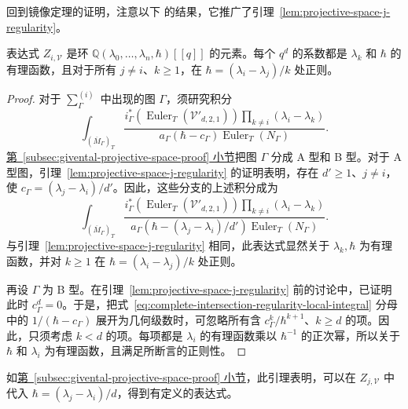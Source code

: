 回到镜像定理的证明，注意以下  的结果，它推广了引理~\ref{lem:projective-space-j-regularity}。
\begin{lemma}\label{lem:complete-intersection-j-regularity}
表达式 $Z_{i,\mathcal V}$ 是环 $\mathbb Q(\lambda_0,\ldots,\lambda_n,\hbar)[[q]]$ 的元素。每个 $q^d$ 的系数都是 $\lambda_k$ 和 $\hbar$ 的有理函数，且对于所有 $j\ne i$、$k\ge1$，在 $\hbar=(\lambda_i-\lambda_j)/k$ 处正则。
\end{lemma}
\begin{proof}
对于 $\sum_\Gamma^{(i)}$ 中出现的图 $\Gamma$，须研究积分
\begin{equation}\label{eq:complete-intersection-regularity-local-integral}
\int_{(\overline M_\Gamma)_T}\frac{i_\Gamma^*(\operatorname{Euler}_T(\mathcal V'_{d,2,1}))\prod_{k\ne i}(\lambda_i-\lambda_k)}{a_\Gamma(\hbar-c_\Gamma)\operatorname{Euler}_T(N_\Gamma)}.
\end{equation}
\hyperref[subsec:givental-projective-space-proof]{第~\ref*{subsec:givental-projective-space-proof} 小节}把图 $\Gamma$ 分成 A 型和 B 型。对于 A 型图，引理~\ref{lem:projective-space-j-regularity} 的证明表明，存在 $d'\ge1$、$j\ne i$，使 $c_\Gamma=(\lambda_j-\lambda_i)/d'$。因此，这些分支的上述积分成为
\[
\int_{(\overline M_\Gamma)_T}\frac{i_\Gamma^*(\operatorname{Euler}_T(\mathcal V'_{d,2,1}))\prod_{k\ne i}(\lambda_i-\lambda_k)}{a_\Gamma(\hbar-(\lambda_j-\lambda_i)/d')\operatorname{Euler}_T(N_\Gamma)}.
\]
与引理~\ref{lem:projective-space-j-regularity} 相同，此表达式显然关于 $\lambda_k,\hbar$ 为有理函数，并对 $k\ge1$ 在 $\hbar=(\lambda_i-\lambda_j)/k$ 处正则。

再设 $\Gamma$ 为 B 型。在引理~\ref{lem:projective-space-j-regularity} 前的讨论中，已证明此时 $c_\Gamma^d=0$。于是，把式~\eqref{eq:complete-intersection-regularity-local-integral} 分母中的 $1/(\hbar-c_\Gamma)$ 展开为几何级数时，可忽略所有含 $c_\Gamma^k/\hbar^{k+1}$、$k\ge d$ 的项。因此，只须考虑 $k<d$ 的项。每项都是 $\lambda_i$ 的有理函数乘以 $\hbar^{-1}$ 的正次幂，所以关于 $\hbar$ 和 $\lambda_i$ 为有理函数，且满足所断言的正则性。
\end{proof}
如\hyperref[subsec:givental-projective-space-proof]{第~\ref*{subsec:givental-projective-space-proof} 小节}，此引理表明，可以在 $Z_{j,\mathcal V}$ 中代入 $\hbar=(\lambda_j-\lambda_i)/d$，得到有定义的表达式。

